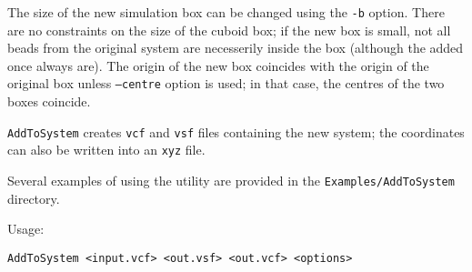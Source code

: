 The size of the new simulation box can be changed using the \texttt{-b}
option. There are no constraints on the size of the cuboid box; if the new
box is small, not all beads from the original system are necesserily inside
the box (although the added once always are). The origin of the new box
coincides with the origin of the original box unless \texttt{--centre}
option is used; in that case, the centres of the two boxes coincide.

\texttt{AddToSystem} creates \texttt{vcf} and \texttt{vsf} files containing
the new system; the coordinates can also be written into an \texttt{xyz}
file.

Several examples of using the utility are provided in the
\texttt{Examples/AddToSystem} directory.

Usage:

\vspace{1em}
\noindent
\texttt{AddToSystem <input.vcf> <out.vsf> <out.vcf> <options>}


